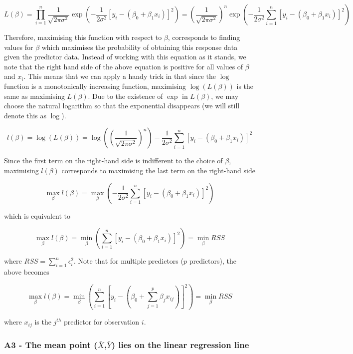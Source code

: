 \documentclass[11pt]{article}
\begin{document}
\[L(\beta) = \prod_{i=1}^n \frac{1}{\sqrt{2 \pi \sigma^2}} \exp \left( -\frac{1}{2\sigma^2} [y_i - (\beta_0 + \beta_1 x_i) ]^2 \right) = \left( \frac{1}{\sqrt{2 \pi \sigma^2}} \right)^n \exp \left( -\frac{1}{2\sigma^2} \sum_{i=1}^n [y_i - (\beta_0 + \beta_1 x_i) ]^2 \right)\]

Therefore, maximising this function with respect to \(\beta\),
corresponds to finding values for \(\beta\) which maximises the
probability of obtaining this response data given the predictor data.
Instead of working with this equation as it stands, we note that the
right hand side of the above equation is positive for all values of
\(\beta\) and \(x_i\). This means that we can apply a handy trick in
that since the \(\log\) function is a monotonically increasing function,
maximising \(\log(L(\beta))\) is the same as maximising \(L(\beta)\).
Due to the existence of \(\exp\) in \(L(\beta)\), we may choose the
natural logarithm so that the exponential disappears (we will still
denote this as \(\log\)).

\[l(\beta) = \log(L(\beta)) = \log \left(\left( \frac{1}{\sqrt{2 \pi \sigma^2}} \right)^n \right) -\frac{1}{2\sigma^2} \sum_{i=1}^n [y_i - (\beta_0 + \beta_1 x_i) ]^2\]

Since the first term on the right-hand side is indifferent to the choice
of \(\beta\), maximising \(l(\beta)\) corresponds to maximising the last
term on the right-hand side

\[\max_{\beta} l(\beta) = \max_{\beta} \left( - \frac{1}{2\sigma^2} \sum_{i=1}^n [y_i - (\beta_0 + \beta_1 x_i) ]^2 \right)\]

which is equivalent to

\[\max_{\beta} l(\beta) = \min_{\beta} \left( \sum_{i=1}^n [y_i - (\beta_0 + \beta_1 x_i) ]^2 \right) = \min_{\beta} RSS\]

where \(RSS = \sum_{i=1}^n \epsilon_i^2\). Note that for multiple
predictors (\(p\) predictors), the above becomes

\[\max_{\beta} l(\beta) = \min_{\beta} \left( \sum_{i=1}^n \left[y_i - \left(\beta_0 + \sum_{j=1}^p \beta_j x_{ij} \right) \right]^2 \right) = \min_{\beta} RSS\]

where \(x_{ij}\) is the \(j^{th}\) predictor for observation \(i\).

    \hypertarget{a3---the-mean-point-barxbary-lies-on-the-linear-regression-line}{%
\subsubsection{\texorpdfstring{A3 - The mean point
(\(\bar{X}\),\(\bar{Y}\)) lies on the linear regression
line}{A3 - The mean point (\textbackslash{}bar\{X\},\textbackslash{}bar\{Y\}) lies on the linear regression line}}\label{a3---the-mean-point-barxbary-lies-on-the-linear-regression-line}}
\end{document}
